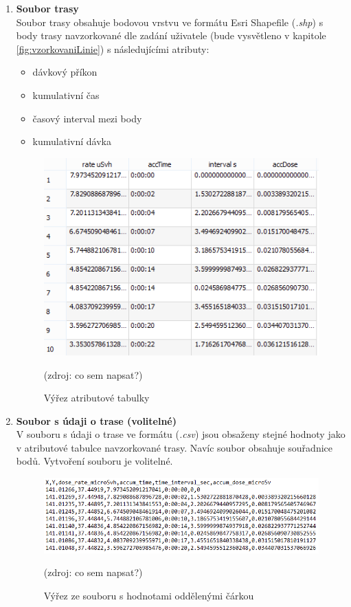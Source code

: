 \begin{enumerate}
	\item \textbf{Soubor trasy} \\
	Soubor trasy obsahuje bodovou vrstvu ve formátu Esri Shapefile (\textit{.shp}) s body trasy navzorkované dle zadání uživatele (bude vysvětleno v kapitole \ref{fig:vzorkovaniLinie}) s následujícími atributy:
		\begin{itemize}
			\item dávkový příkon
			\item kumulativní čas
			\item časový interval mezi body
			\item kumulativní dávka
		\end{itemize}
			\begin{figure}[H]
    			\centering
      			\includegraphics[scale=0.8]{./pictures/atributova_tabulka.png}
      				\caption[Výřez atributové tabulky]{Výřez atributové tabulky}(zdroj: co sem napsat?)
     				\label{fig:atributova_tabulka}
  			\end{figure}
  	
  	\item \textbf{Soubor s údaji o trase (volitelné)} \\
  	V souboru s údaji o trase ve formátu  (\textit{.csv}) jsou obsaženy stejné hodnoty jako v atributové tabulce navzorkované trasy. Navíc soubor obsahuje souřadnice bodů. Vytvoření souboru je volitelné. 
  			\begin{figure}[H]
    			\centering
      			\includegraphics[scale=0.8]{./pictures/csv.png}
      				\caption[Výřez ze souboru s hodnotami oddělenými čárkou]{Výřez ze souboru s hodnotami oddělenými čárkou}(zdroj: co sem napsat?)
     				\label{fig:csv}
  			\end{figure}	
\end{enumerate}

